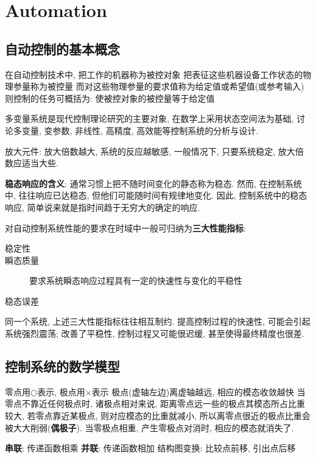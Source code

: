 \documentclass[openany]{book}
\begin{document}
\chapter{Automation}
\section{自动控制的基本概念}
在自动控制技术中, 把工作的机器称为被控对象
把表征这些机器设备工作状态的物理参量称为被控量
而对这些物理参量的要求值称为给定值或希望值(或参考输入)
则控制的任务可概括为: 使被控对象的被控量等于给定值

多变量系统是现代控制理论研究的主要对象, 在数学上采用状态空间法为基础, 讨论多变量, 变参数, 非线性, 高精度, 高效能等控制系统的分析与设计.

放大元件: 放大倍数越大, 系统的反应越敏感, 一般情况下, 只要系统稳定, 放大倍数应适当大些.

\textbf{稳态响应的含义}: 通常习惯上把不随时间变化的静态称为稳态. 然而, 在控制系统中, 往往响应已达稳态, 但他们可能随时间有规律地变化. 因此, 控制系统中的稳态响应, 简单说来就是指时间趋于无穷大的确定的响应.

对自动控制系统性能的要求在时域中一般可归纳为\textbf{三大性能指标}:
\begin{description}
\item[稳定性]
\item[瞬态质量] 要求系统瞬态响应过程具有一定的快速性与变化的平稳性
\item[稳态误差]
\end{description}
同一个系统, 上述三大性能指标往往相互制约. 提高控制过程的快速性, 可能会引起系统强烈震荡; 改善了平稳性, 控制过程又可能很迟缓, 甚至使得最终精度也很差.

\section{控制系统的数学模型}
零点用$\bigcirc$表示, 极点用$\times$表示 \newline
极点(虚轴左边)离虚轴越远, 相应的模态收敛越快 \newline
当零点不靠近任何极点时, 诸极点相对来说, 距离零点远一些的极点其模态所占比重较大, 若零点靠近某极点, 则对应模态的比重就减小, 所以离零点很近的极点比重会被大大削弱(\textbf{偶极子}). 当零极点相重, 产生零极点对消时, 相应的模态就消失了.

\textbf{串联}: 传递函数相乘 \newline
\textbf{并联}: 传递函数相加 \newline
结构图变换: 比较点前移, 引出点后移
\end{document}
